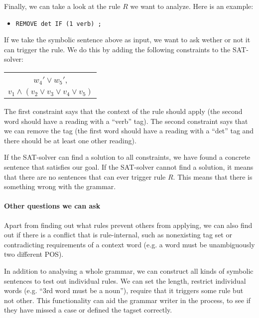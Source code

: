 Finally, we can take a look at the rule $R$ we want to analyze. Here is an example:
\begin{itemize}
\item[] \texttt{REMOVE det IF (1 verb) ;}
\end{itemize}
If we take the symbolic sentence above as input, we want to ask wether or not it can trigger the rule. We do this by adding the following constraints to the SAT-solver:
\begin{center}
\begin{tabular}{c}
$w_4' \vee w_5'$, \\
$v_1 \wedge (v_2 \vee v_3 \vee v_4 \vee v_5)$
\end{tabular}
\end{center}
The first constraint says that the context of the rule should apply (the second word should have a reading with a ``verb'' tag). The second constraint says that we can remove the tag (the first word should have a reading with a ``det'' tag and there should be at least one other reading).

If the SAT-solver can find a solution to all constraints, we have found a concrete sentence that satisfies our goal. If the SAT-solver cannot find a solution, it means that there are no sentences that can ever trigger rule $R$. This means that there is something wrong with the grammar.

\paragraph{Other questions we can ask}

Apart from finding out what rules prevent others from applying, we can also find out if there is a conflict that is rule-internal, such as nonexisting tag set or contradicting requirements of a context word (e.g. a word must be unambiguously two different POS).

In addition to analysing a whole grammar, 
we can construct all kinds of symbolic sentences to test out individual rules. 
We can set the length, restrict individual words (e.g. ``3rd word must be a noun''), require that it triggers some rule but not other. 
This functionality can aid the grammar writer in the process, to see if they have missed a case or defined the tagset correctly.






